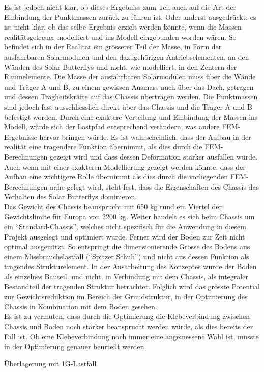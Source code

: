 Es ist jedoch nicht klar, ob dieses Ergebniss zum Teil auch auf die Art der Einbindung der Punktmassen zurück zu führen ist. Oder anderst ausgedrückt: es ist nicht klar, ob das selbe Ergebnis erzielt werden könnte, wenn die Massen realitätsgetreuer modelliert und ins Modell eingebunden worden wären. So befindet sich in der Realität ein grösserer Teil der Masse, in Form der ausfahrbaren Solarmodulen und den dazugehörigen Antriebselementen, an den Wänden des Solar Butterflys und nicht, wie modelliert, in den Zentern der Raumelemente.
Die Masse der ausfahrbaren Solarmodulen muss über die Wände und Träger A und B, zu einem gewissen Ausmass auch über das Dach, getragen und dessen Trägheitskräfte auf das Chassis übertragen werden. Die Punktmassen sind jedoch fast ausschliesslich direkt über das Chassis und die Träger A und B befestigt worden. Durch eine exaktere Verteilung und Einbindung der Massen ins Modell, würde sich der Lastpfad entsprechend verändern, was andere FEM-Ergebnisse hervor bringen würde.
Es ist wahrscheinlich, dass der Aufbau in der realität eine tragendere Funktion übernimmt, als dies durch die FEM-Berechnungen gezeigt wird und dass dessen Deformation stärker ausfallen würde.\\
Auch wenn mit einer exakteren Modellierung gezeigt werden könnte, dass der Aufbau eine wichtigere Rolle übernimmt als dies durch die vorliegenden FEM-Berechnungen nahe gelegt wird, steht fest, dass die Eigenschaften des Chassis das Verhalten des Solar Butterflys dominieren.\\

Das Gewicht des Chassis beansprucht mit 650 kg rund ein Viertel der Gewichtslimite für Europa von 2200 kg. Weiter handelt es sich beim Chassis um ein ``Standard-Chassis'', welches nicht spezifisch für die Anwendung in diesem Projekt ausgelegt und optimiert wurde. Ferner wird der Boden zur Zeit nicht optimal ausgenützt. So entspringt die dimensionierende Grösse des Bodens aus einem Missbrauchslastfall (``Spitzer Schuh'') und nicht aus dessen Funktion als tragendes Strukturelement. In der Ausarbeitung des Konzeptes wurde der Boden als einzelnes Bauteil, und nicht, in Verbindung mit dem Chassis, als integraler Bestandteil der tragenden Struktur betrachtet. Folglich wird das grösste Potential zur Gewichtsreduktion im Bereich der Grundstruktur, in der Optimierung des Chassis in Kombination mit dem Boden gesehen.\\
Es ist zu vermuten, dass durch die Optimierung die Klebeverbindung zwischen Chassis und Boden noch stärker beansprucht werden würde, als dies bereits der Fall ist. Ob eine Klebeverbindung noch immer eine angemessene Wahl ist, müsste in der Optimierung genauer beurteilt werden.
\newpage


Überlagerung mit 1G-Lastfall
